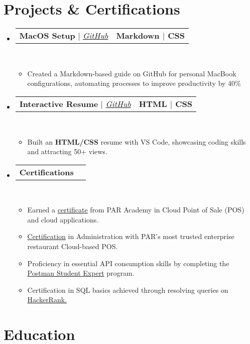\documentclass[letterpaper,11pt]{article}
\makeatletter
\newcommand{\resumeItem}[1]{
  \item\small{
    {#1 \vspace{0pt}}
  }
}
\newcommand{\resumeProjectHeading}[2]{
    \item
    \begin{tabular*}{1.001\textwidth}{l@{\extracolsep{\fill}}r}
      \small#1 & \textbf{\small #2}\\
    \end{tabular*}\vspace{-7pt}
}
\newcommand{\resumeSubHeadingListStart}{\begin{itemize}[leftmargin=0.0in, label={}]}
\newcommand{\resumeSubHeadingListEnd}{\end{itemize}}\vspace{0pt}
\newcommand{\resumeItemListStart}{\begin{itemize}}
\newcommand{\resumeItemListEnd}{\end{itemize}\vspace{-5pt}}
\makeatother
\begin{document}
\section{Projects \& Certifications} 
    \vspace{-5pt}
    \resumeSubHeadingListStart
    \resumeProjectHeading
            {\textbf{{MacOS Setup}} $|$ \emph{\href{https://github.com/DejanJandric/MyMacOS-Setup/blob/main/MyMacOs.md/}{GitHub}}}{Markdown $|$ CSS}
            \\[5mm]
          \resumeItemListStart
            \resumeItem{Created a Markdown-based guide on GitHub for personal MacBook configurations, automating processes to improve productivity by 40\%}
          \resumeItemListEnd
 \vspace{-20pt}
 \resumeProjectHeading
            {\textbf{{Interactive Resume}} $|$ \emph{\href{https://github.com/DejanJandric/HTML-Resume}{GitHub}}}{HTML $|$ CSS}
            \\[5mm]
          \resumeItemListStart
            \resumeItem{Built an \textbf{HTML/CSS} resume with VS Code, showcasing coding skills and attracting 50+ views. }
          \resumeItemListEnd
 \vspace{-17pt}
 \resumeProjectHeading
{\textbf{{Certifications}} }{}
\\[5mm]
\resumeItemListStart
\resumeItem{Earned a \href{https://drive.google.com/file/d/12j13wqp93bqEYY4gVx3YfzT-3_Q5FbUd/view?usp=sharing}{certificate} from PAR Academy in Cloud Point of Sale (POS) and cloud applications.}
\resumeItem {\href{https://drive.google.com/file/d/1C-TxQVIZusvolZf9iFp9pWiaDz5GFI3O/view?usp=sharing}{Certification} in Administration with PAR’s most trusted enterprise restaurant Cloud-based POS.}
\resumeItem{Proficiency in essential API consumption skills by completing the \href{https://badgr.com/backpack/badges/684070efa478483de1b37b74?navigationSource=backpack}{Postman Student Expert} program.}
\resumeItem{Certification in SQL basics achieved through resolving queries on \href{https://www.hackerrank.com/certificates/fd66a45691dd}{HackerRank.}}
\resumeItemListEnd

\resumeSubHeadingListEnd
\vspace{-28pt}
 
\section{Education} \\[1mm]
\end{document}

